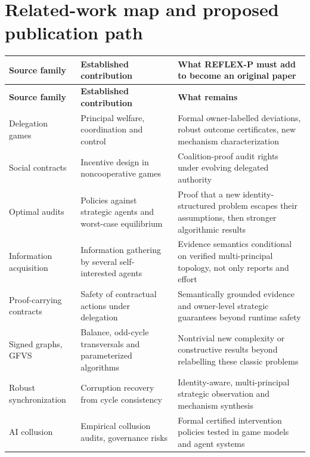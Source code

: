 \documentclass[10pt,a4paper]{article}
\theoremstyle{definition}\newtheorem{definition}[theorem]{Definition}
\begin{document}
\section{Related-work map and proposed publication path}
\small
\begin{longtable}{p{.23\linewidth}p{.32\linewidth}p{.39\linewidth}}
\toprule\textbf{Source family} & \textbf{Established contribution} & \textbf{What REFLEX-P must add to become an original paper}\\\midrule\endfirsthead
\toprule\textbf{Source family} & \textbf{Established contribution} & \textbf{What remains}\\\midrule\endhead
Delegation games \cite{sourbut2024} & Principal welfare, coordination and control & Formal owner-labelled deviations, robust outcome certificates, new mechanism characterization\\
Social contracts \cite{davoust2020} & Incentive design in noncooperative games & Coalition-proof audit rights under evolving delegated authority\\
Optimal audits \cite{das2026} & Policies against strategic agents and worst-case equilibrium & Proof that a new identity-structured problem escapes their assumptions, then stronger algorithmic results\\
Information acquisition \cite{cacciamani2024} & Information gathering by several self-interested agents & Evidence semantics conditional on verified multi-principal topology, not only reports and effort\\
Proof-carrying contracts \cite{ciliberto2026} & Safety of contractual actions under delegation & Semantically grounded evidence and owner-level strategic guarantees beyond runtime safety\\
Signed graphs, GFVS \cite{zaslavsky2010,cygan2010,jansen2024} & Balance, odd-cycle transversals and parameterized algorithms & Nontrivial new complexity or constructive results beyond relabelling these classic problems\\
Robust synchronization \cite{lerman2021} & Corruption recovery from cycle consistency & Identity-aware, multi-principal strategic observation and mechanism synthesis\\
AI collusion \cite{colosseum2026,collusion2026} & Empirical collusion audits, governance risks & Formal certified intervention policies tested in game models and agent systems\\\bottomrule
\end{longtable}\normalsize
\end{document}
